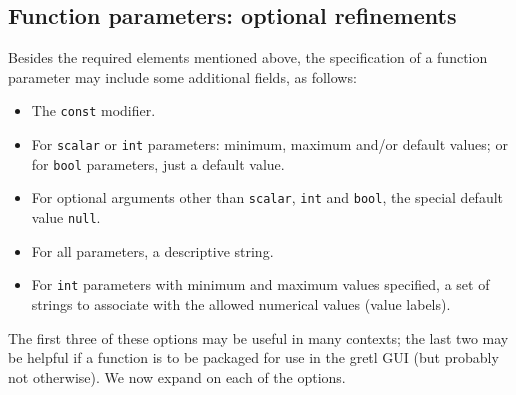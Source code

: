 \subsection{Function parameters: optional refinements}

Besides the required elements mentioned above, the specification of a
function parameter may include some additional fields, as follows:
\begin{itemize}
\item The \texttt{const} modifier.
\item For \texttt{scalar} or \texttt{int} parameters: minimum, maximum
  and/or default values; or for \texttt{bool} parameters, just a
  default value.
\item For optional arguments other than \texttt{scalar}, \texttt{int}
  and \texttt{bool}, the special default value \texttt{null}.
\item For all parameters, a descriptive string.
\item For \texttt{int} parameters with minimum and maximum values
  specified, a set of strings to associate with the allowed numerical
  values (value labels).
\end{itemize}

The first three of these options may be useful in many contexts; the
last two may be helpful if a function is to be packaged for use in
the gretl GUI (but probably not otherwise). We now expand on
each of the options.

